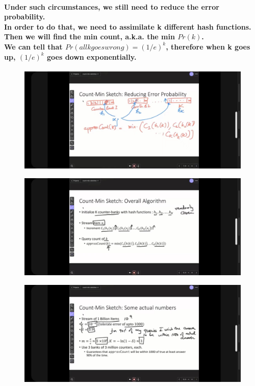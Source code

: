 \documentclass{article}
\begin{document}
\paragraph{
    Under such circumstances, we still need to reduce the error probability.\\
    In order to do that, we need to assimilate k different hash functions.\\
    Then  we will find the min count, a.k.a. the min $Pr(k)$.\\
    We can tell that $Pr(all k goes wrong)=(1/e)^k$, therefore when k goes up, $(1/e)^k$ goes down exponentially.\\
}

\begin{figure}[H]
    \includegraphics[width=\textwidth]{reducingerrorprobability.jpg}
\end{figure}

\begin{figure}[H]
    \includegraphics[width=\textwidth]{overallalgorithm.jpg}
\end{figure}

\begin{figure}[H]
    \includegraphics[width=\textwidth]{someactualnumbers.jpg}
\end{figure}
\end{document}
